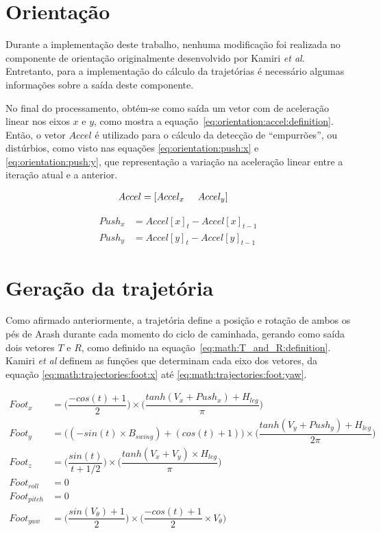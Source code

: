 \section{Orientação}
\label{sec:math:orientation}

Durante a implementação deste trabalho, nenhuma modificação foi realizada no componente de orientação originalmente desenvolvido por Kamiri \textit{et al}. Entretanto, para a implementação do cálculo da trajetórias é necessário algumas informações sobre a saída deste componente.

No final do processamento, obtém-se como saída um vetor com de aceleração linear nos eixos $x$ e $y$, como mostra a equação~\ref{eq:orientation:accel:definition}. Então, o vetor $Accel$ é utilizado para o cálculo da detecção de ``empurrões'', ou distúrbios, como visto nas equações \ref{eq:orientation:push:x} e \ref{eq:orientation:push:y}, que representação a variação na aceleração linear entre a iteração atual e a anterior.

\begin{align}
	Accel &= [Accel_x \hspace{5mm} Accel_y] \label{eq:orientation:accel:definition}
\end{align}

\begin{align}
	Push_x &= Accel[x]_t - Accel[x]_{t-1} 	 \label{eq:orientation:push:x}   \\
	Push_y &= Accel[y]_t - Accel[y]_{t-1}     \label{eq:orientation:push:y}
\end{align}

\section{Geração da trajetória}
\label{sec:math:trajectories}

Como afirmado anteriormente, a trajetória define a posição e rotação de ambos os pés de Arash durante cada momento do ciclo de caminhada, gerando como saída dois vetores $T$ e $R$, como definido na equação~\ref{eq:math:T_and_R:definition}. Kamiri \textit{et al} definem as funções que determinam cada eixo dos vetores, da equação \ref{eq:math:trajectories:foot:x} até \ref{eq:math:trajectories:foot:yaw}.

\begin{align}
      Foot_x &= \bigg(\dfrac{-cos(t) + 1}{2}\bigg) \times \bigg(\dfrac{tanh(V_x + Push_x) + H_{leg}}{\pi}\bigg)                    \label{eq:math:trajectories:foot:x}  \\
      Foot_y &= \big((-sin(t) \times B_{swing}) + (cos(t) + 1)\big) \times \bigg(\dfrac{tanh(V_y + Push_y) + H_{leg}}{2\pi}\bigg) \\
      Foot_z &= \bigg(\dfrac{sin(t)}{t + 1/2}\bigg) \times \bigg(\dfrac{tanh(V_x + V_y) \times H_{leg}}{\pi}\bigg) \\
 Foot_{roll} &= 0 \\
Foot_{pitch} &= 0 \\
  Foot_{yaw} &= \bigg(\dfrac{sin(V_\theta) + 1}{2}\bigg) \times \bigg(\dfrac{-cos(t) + 1}{2} \times V_\theta\bigg)     \label{eq:math:trajectories:foot:yaw}
\end{align}

